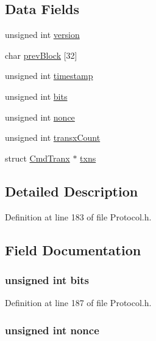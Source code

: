 \subsection*{Data Fields}
\begin{DoxyCompactItemize}
\item 
unsigned int \hyperlink{struct_cmd_block_a5408ac5df4c170828874e1b10b4c35a0}{version}
\item 
char \hyperlink{struct_cmd_block_a099897f937ebe9e9634c5098e38c7cab}{prevBlock} \mbox{[}32\mbox{]}
\item 
unsigned int \hyperlink{struct_cmd_block_ad4048a3c215cbfcdc127ada8e0fa5445}{timestamp}
\item 
unsigned int \hyperlink{struct_cmd_block_aa6da25dae1e7263af226d4b026811d7f}{bits}
\item 
unsigned int \hyperlink{struct_cmd_block_ad73ee4141a6536b03f4e493b56859e86}{nonce}
\item 
unsigned int \hyperlink{struct_cmd_block_a74334da90ccc4ebde303deecbe77f9dd}{transxCount}
\item 
struct \hyperlink{struct_cmd_tranx}{CmdTranx} $\ast$ \hyperlink{struct_cmd_block_a50142212678034606e6aa3304ea06fb7}{txns}
\end{DoxyCompactItemize}


\subsection{Detailed Description}


Definition at line 183 of file Protocol.h.



\subsection{Field Documentation}
\hypertarget{struct_cmd_block_aa6da25dae1e7263af226d4b026811d7f}{
\subsubsection[{bits}]{\setlength{\rightskip}{0pt plus 5cm}unsigned int {\bf bits}}}
\label{struct_cmd_block_aa6da25dae1e7263af226d4b026811d7f}


Definition at line 187 of file Protocol.h.

\hypertarget{struct_cmd_block_ad73ee4141a6536b03f4e493b56859e86}{
\subsubsection[{nonce}]{\setlength{\rightskip}{0pt plus 5cm}unsigned int {\bf nonce}}}
\label{struct_cmd_block_ad73ee4141a6536b03f4e493b56859e86}


